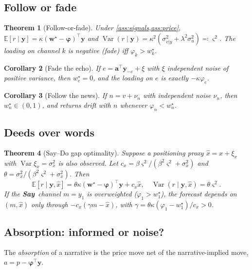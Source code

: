 \documentclass[10pt,twocolumn,letterpaper]{article}
\theoremstyle{plain}
\newtheorem{theorem}{Theorem}
\newtheorem{corollary}[theorem]{Corollary}
\theoremstyle{definition}
\theoremstyle{remark}
\newcommand{\E}{\mathbb{E}}
\newcommand{\w}{\bm{w}}
\newcommand{\y}{\bm{y}}
\newcommand{\bphi}{\bm{\varphi}}
\DeclareMathOperator{\Var}{Var}
\newcommand{\SAY}{\textcolor{say}{\textsf{\textbf{Say}}}}
\begin{document}
\subsection{Follow or fade}

\begin{theorem}[Follow-or-fade]\label{thm:followfade}
Under \cref{ass:signals,ass:price}, $\E[r\mid\y]=\kappa(\w^\star-\bphi)^\top\y$ and $\Var(r\mid\y)=\kappa^2(\sigma^2_{v|y}+\lambda^2\sigma_u^2)\eqqcolon\varsigma^2$. The loading on channel $k$ is negative (\emph{fade}) iff $\varphi_k>w^\star_k$.
\end{theorem}

\begin{corollary}[Fade the echo]\label{cor:echo}
If $e=\bm a^\top\y_{-e}+\xi$ with $\xi$ independent noise of positive variance, then $w^\star_e=0$, and the loading on $e$ is exactly $-\kappa\varphi_e$.
\end{corollary}

\begin{corollary}[Follow the news]\label{cor:news}
If $n=v+\nu_n$ with independent noise $\nu_n$, then $w^\star_n\in(0,1)$, and returns drift with $n$ whenever $\varphi_n<w^\star_n$.
\end{corollary}

\subsection{Deeds over words}

\begin{theorem}[Say--Do gap optimality]\label{thm:saydo}
Suppose a positioning proxy $\hat x=x+\xi_x$ with $\Var\xi_x=\sigma_x^2$ is also observed. Let $c_x=\beta\varsigma^2/(\beta^2\varsigma^2+\sigma_x^2)$ and $\theta=\sigma_x^2/(\beta^2\varsigma^2+\sigma_x^2)$. Then
\[
  \E[r\mid\y,\hat x]=\theta\kappa(\w^\star-\bphi)^\top\y+c_x\hat x,\quad \Var(r\mid\y,\hat x)=\theta\varsigma^2 .
\]
If the \SAY\ channel $m=y_1$ is overweighted ($\varphi_1>w^\star_1$), the forecast depends on $(m,\hat x)$ only through $-c_x(\gamma m-\hat x)$, with $\gamma=\theta\kappa(\varphi_1-w^\star_1)/c_x>0$.
\end{theorem}

\subsection{Absorption: informed or noise?}\label{sec:absorption}

The \emph{absorption} of a narrative is the price move net of the narrative-implied move, $a=p-\bphi^\top\y$.
\end{document}

